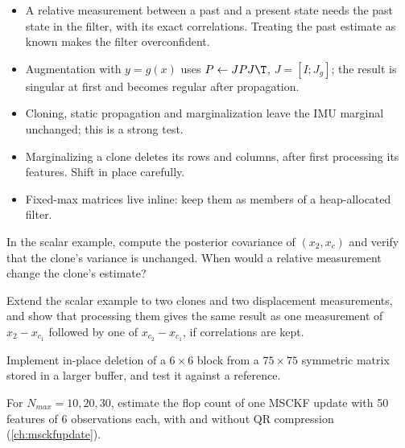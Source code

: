\begin{takeaways}
\begin{itemize}
  \item A relative measurement between a past and a present state needs the past state in the filter, with its exact
        correlations. Treating the past estimate as known makes the filter overconfident.
  \item Augmentation with $y = g(x)$ uses $P \gets JPJ\T$, $J = [I; J_g]$; the result is singular at first and becomes regular
        after propagation.
  \item Cloning, static propagation and marginalization leave the IMU marginal unchanged; this is a strong test.
  \item Marginalizing a clone deletes its rows and columns, after first processing its features. Shift in place carefully.
  \item Fixed-max matrices live inline: keep them as members of a heap-allocated filter.
\end{itemize}
\end{takeaways}

\begin{exercises}
  \item In the scalar example, compute the posterior covariance of $(x_2, x_c)$ and verify that the clone's variance is
        unchanged. When would a relative measurement change the clone's estimate?
  \item Extend the scalar example to two clones and two displacement measurements, and show that processing them gives the
        same result as one measurement of $x_2 - x_{c_1}$ followed by one of $x_{c_2} - x_{c_1}$, if correlations are kept.
  \item Implement in-place deletion of a $6\times6$ block from a $75\times75$ symmetric matrix stored in a larger buffer, and test it
        against a reference.
  \item For $N_{max} = 10, 20, 30$, estimate the flop count of one MSCKF update with 50 features of 6 observations each, with and
        without QR compression (\cref{ch:msckfupdate}).
\end{exercises}
